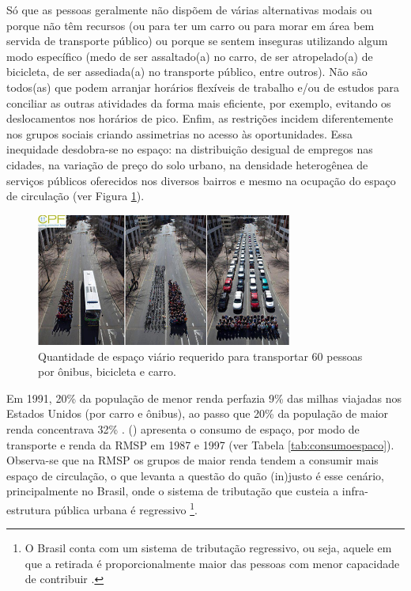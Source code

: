 Só que as pessoas geralmente não dispõem de várias alternativas modais ou porque não têm recursos (ou para ter um carro ou para morar em área bem servida de transporte público) ou porque se sentem inseguras utilizando algum modo específico (medo de ser assaltado(a) no carro, de ser atropelado(a) de bicicleta, de ser assediada(a) no transporte público, entre outros). Não são todos(as) que podem arranjar horários flexíveis de trabalho e/ou de estudos para conciliar as outras atividades da forma mais eficiente, por exemplo, evitando os deslocamentos nos horários de pico. Enfim, as restrições incidem diferentemente nos grupos sociais criando assimetrias no acesso às oportunidades. Essa inequidade desdobra-se no espaço: na distribuição desigual de empregos nas cidades, na variação de preço do solo urbano, na densidade heterogênea de serviços públicos oferecidos nos diversos bairros e mesmo na ocupação do espaço de circulação (ver Figura \ref{fig:equidade}).

\begin{figure}[htb]%
    \caption{\label{fig:equidade}Quantidade de espaço viário requerido para transportar 60 pessoas por ônibus, bicicleta e carro.}%
    \begin{center}%
        \includegraphics[width=0.75\textwidth]{./imagens/equidade-sqn.png}%
    \end{center}%
\end{figure}%

Em 1991, 20\% da população de menor renda perfazia 9\% das milhas viajadas nos Estados Unidos (por carro e ônibus), ao passo que 20\% da população de maior renda concentrava 32\% .
 (\citeyear{VASCONCELLOS2001}) apresenta o consumo de espaço, por modo de transporte e renda da RMSP em 1987 e 1997 (ver Tabela \ref{tab:consumoespaco}). Observa-se que na RMSP os grupos de maior renda tendem a consumir mais espaço de circulação, o que levanta a questão do quão (in)justo é esse cenário, principalmente no Brasil, onde o sistema de tributação que custeia a infra-estrutura pública urbana é regressivo
\footnote{O Brasil conta com um sistema de tributação regressivo, ou seja, aquele em que a retirada é proporcionalmente maior das pessoas com menor capacidade de contribuir \cite{GRECO2005}.}.

